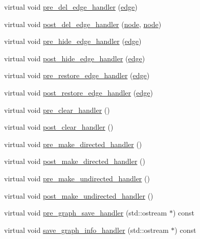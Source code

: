 \begin{DoxyCompactItemize}
virtual void \mbox{\hyperlink{classgraph_a2cd0986dc5bcbfdbf0635c39e610784b}{pre\+\_\+del\+\_\+edge\+\_\+handler}} (\mbox{\hyperlink{classedge}{edge}})
\item 
virtual void \mbox{\hyperlink{classgraph_ab9ac8bcc7288986de69cd467beb33600}{post\+\_\+del\+\_\+edge\+\_\+handler}} (\mbox{\hyperlink{classnode}{node}}, \mbox{\hyperlink{classnode}{node}})
\item 
virtual void \mbox{\hyperlink{classgraph_aa33201befa6ad7433becd7424d6de55b}{pre\+\_\+hide\+\_\+edge\+\_\+handler}} (\mbox{\hyperlink{classedge}{edge}})
\item 
virtual void \mbox{\hyperlink{classgraph_ad4614e74a125054eb3e180f6f32ab7bb}{post\+\_\+hide\+\_\+edge\+\_\+handler}} (\mbox{\hyperlink{classedge}{edge}})
\item 
virtual void \mbox{\hyperlink{classgraph_a569d227d9f4914278a143d52139e3303}{pre\+\_\+restore\+\_\+edge\+\_\+handler}} (\mbox{\hyperlink{classedge}{edge}})
\item 
virtual void \mbox{\hyperlink{classgraph_adfc71011ae82f047c550eba6d9e7bb3a}{post\+\_\+restore\+\_\+edge\+\_\+handler}} (\mbox{\hyperlink{classedge}{edge}})
\item 
virtual void \mbox{\hyperlink{classgraph_a16ccad78837d16be59854549cd2d847a}{pre\+\_\+clear\+\_\+handler}} ()
\item 
virtual void \mbox{\hyperlink{classgraph_a870633528590b7925cd27776bdd2bbd2}{post\+\_\+clear\+\_\+handler}} ()
\item 
virtual void \mbox{\hyperlink{classgraph_a505198f412b1e426e9d09b62ea9811e8}{pre\+\_\+make\+\_\+directed\+\_\+handler}} ()
\item 
virtual void \mbox{\hyperlink{classgraph_a43dc35def3d8125eb8f3841d55e0b1c8}{post\+\_\+make\+\_\+directed\+\_\+handler}} ()
\item 
virtual void \mbox{\hyperlink{classgraph_a8964107991e6f411ba8992f6b1deda21}{pre\+\_\+make\+\_\+undirected\+\_\+handler}} ()
\item 
virtual void \mbox{\hyperlink{classgraph_a3d2bc348d12931aff1d2e97a6b4285c3}{post\+\_\+make\+\_\+undirected\+\_\+handler}} ()
\item 
virtual void \mbox{\hyperlink{classgraph_ab257e02f6fd04fef244032a3a15bec9f}{pre\+\_\+graph\+\_\+save\+\_\+handler}} (std\+::ostream $\ast$) const
\item 
virtual void \mbox{\hyperlink{classgraph_a0f20022d6f4951b8836a204aa85b7693}{save\+\_\+graph\+\_\+info\+\_\+handler}} (std\+::ostream $\ast$) const
\item 

\end{DoxyCompactItemize}
